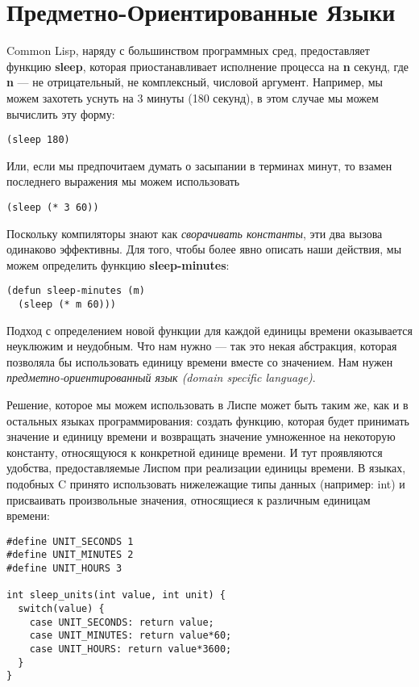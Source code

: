 \section{Предметно-Ориентированные Языки}\label{section_domain_specific_languages}

Common Lisp, наряду с большинством программных сред, предоставляет функцию \textbf{sleep}, которая приостанавливает исполнение процесса на \textbf{n} секунд, где \textbf{n} --- не отрицательный, не комплексный, числовой аргумент. Например, мы можем захотеть уснуть на 3 минуты (180 секунд), в этом случае мы можем вычислить эту форму:

\begin{verbatim}
(sleep 180)
\end{verbatim}

Или, если мы предпочитаем думать о засыпании в терминах минут, то взамен последнего выражения мы можем использовать

\begin{verbatim}
(sleep (* 3 60))
\end{verbatim}

Поскольку компиляторы знают как \emph{сворачивать константы}, эти два вызова одинаково эффективны. Для того, чтобы более явно описать наши действия, мы можем определить функцию \textbf{sleep-minutes}:

\begin{verbatim}
(defun sleep-minutes (m)
  (sleep (* m 60)))
\end{verbatim}

Подход с определением новой функции для каждой единицы времени оказывается неуклюжим и неудобным. Что нам нужно --- так это некая абстракция, которая позволяла бы использовать единицу времени вместе со значением. Нам нужен \emph{предметно-ориентированный язык (domain specific language)}.

Решение, которое мы можем использовать в Лиспе может быть таким же, как и в остальных языках программирования: создать функцию, которая будет принимать значение и единицу времени и возвращать значение умноженное на некоторую константу, относящуюся к конкретной единице времени. И тут проявляются удобства, предоставляемые Лиспом при реализации единицы времени. В языках, подобных C принято использовать нижележащие типы данных (например: int) и присваивать произвольные значения, относящиеся к различным единицам времени:

\begin{verbatim}
#define UNIT_SECONDS 1
#define UNIT_MINUTES 2
#define UNIT_HOURS 3

int sleep_units(int value, int unit) {
  switch(value) {
    case UNIT_SECONDS: return value;
    case UNIT_MINUTES: return value*60;
    case UNIT_HOURS: return value*3600;
  }
}
\end{verbatim}

